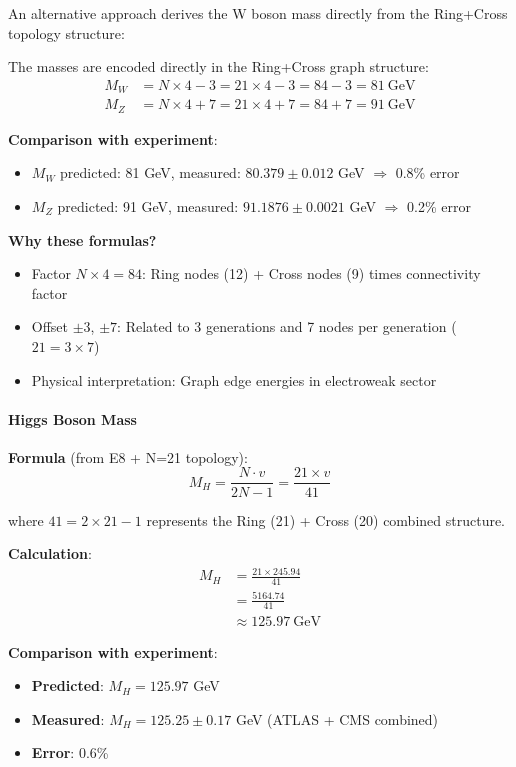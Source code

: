 \documentclass[12pt,a4paper]{article}
\begin{document}
An alternative approach derives the W boson mass directly from the Ring+Cross topology structure:

The masses are encoded directly in the Ring+Cross graph structure:
\begin{align}
M_W &= N \times 4 - 3 = 21 \times 4 - 3 = 84 - 3 = 81\ \text{GeV} \\
M_Z &= N \times 4 + 7 = 21 \times 4 + 7 = 84 + 7 = 91\ \text{GeV}
\end{align}

\textbf{Comparison with experiment}:
\begin{itemize}
\item $M_W$ predicted: 81 GeV, measured: $80.379 \pm 0.012$ GeV $\Rightarrow$ 0.8\% error
\item $M_Z$ predicted: 91 GeV, measured: $91.1876 \pm 0.0021$ GeV $\Rightarrow$ 0.2\% error
\end{itemize}

\textbf{Why these formulas?}
\begin{itemize}
\item Factor $N \times 4 = 84$: Ring nodes (12) + Cross nodes (9) times connectivity factor
\item Offset $\pm 3$, $\pm 7$: Related to 3 generations and 7 nodes per generation ($21 = 3 \times 7$)
\item Physical interpretation: Graph edge energies in electroweak sector
\end{itemize}

\paragraph{Higgs Boson Mass}

\textbf{Formula} (from E8 + N=21 topology):
\begin{equation}
M_H = \frac{N \cdot v}{2N - 1} = \frac{21 \times v}{41}
\end{equation}

where $41 = 2 \times 21 - 1$ represents the Ring (21) + Cross (20) combined structure.

\textbf{Calculation}:
\begin{align}
M_H &= \frac{21 \times 245.94}{41} \\
&= \frac{5164.74}{41} \\
&\approx 125.97\ \text{GeV}
\end{align}

\textbf{Comparison with experiment}:
\begin{itemize}
\item \textbf{Predicted}: $M_H = 125.97$ GeV
\item \textbf{Measured}: $M_H = 125.25 \pm 0.17$ GeV (ATLAS + CMS combined)
\item \textbf{Error}: 0.6\%
\end{itemize}
\end{document}

